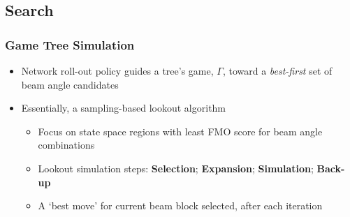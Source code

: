 \subsection{Search}
\begin{frame}
\frametitle{Game Tree Simulation}
\begin{itemize}
	\item Network roll-out policy guides a tree's game, $\Gamma$, toward a \textit{best-first} set of  beam angle candidates
	\vspace{0.1in}
	\item Essentially, a sampling-based lookout algorithm 
	\vspace{0.1in}
	\begin{itemize}
		\item Focus on state space regions with least FMO score for beam angle combinations
		\vspace{0.1in}
		\item Lookout simulation steps: \textbf{Selection}; \textbf{Expansion};  \textbf{Simulation}; \textbf{Back-up}
		\vspace{0.1in}
		\item A `best move' for current beam block  selected, after each  iteration
	\end{itemize}  
\end{itemize}
\end{frame}

